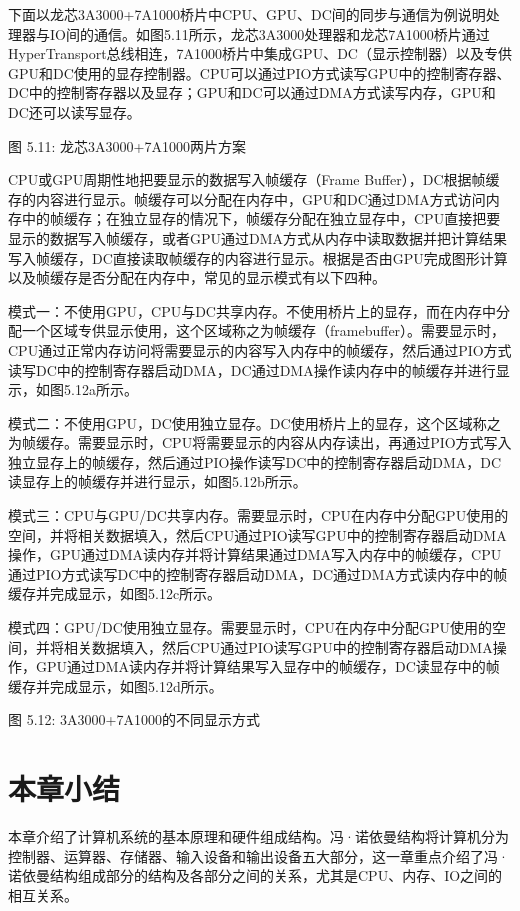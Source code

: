 \documentclass[]{ctexbook}
\begin{document}
下面以龙芯3A3000+7A1000桥片中CPU、GPU、DC间的同步与通信为例说明处理器与IO间的通信。如图5.11所示，龙芯3A3000处理器和龙芯7A1000桥片通过HyperTransport总线相连，7A1000桥片中集成GPU、DC（显示控制器）以及专供GPU和DC使用的显存控制器。CPU可以通过PIO方式读写GPU中的控制寄存器、DC中的控制寄存器以及显存；GPU和DC可以通过DMA方式读写内存，GPU和DC还可以读写显存。

图 5.11: 龙芯3A3000+7A1000两片方案

CPU或GPU周期性地把要显示的数据写入帧缓存（Frame Buffer），DC根据帧缓存的内容进行显示。帧缓存可以分配在内存中，GPU和DC通过DMA方式访问内存中的帧缓存；在独立显存的情况下，帧缓存分配在独立显存中，CPU直接把要显示的数据写入帧缓存，或者GPU通过DMA方式从内存中读取数据并把计算结果写入帧缓存，DC直接读取帧缓存的内容进行显示。根据是否由GPU完成图形计算以及帧缓存是否分配在内存中，常见的显示模式有以下四种。

模式一：不使用GPU，CPU与DC共享内存。不使用桥片上的显存，而在内存中分配一个区域专供显示使用，这个区域称之为帧缓存（framebuffer）。需要显示时，CPU通过正常内存访问将需要显示的内容写入内存中的帧缓存，然后通过PIO方式读写DC中的控制寄存器启动DMA，DC通过DMA操作读内存中的帧缓存并进行显示，如图5.12a所示。

模式二：不使用GPU，DC使用独立显存。DC使用桥片上的显存，这个区域称之为帧缓存。需要显示时，CPU将需要显示的内容从内存读出，再通过PIO方式写入独立显存上的帧缓存，然后通过PIO操作读写DC中的控制寄存器启动DMA，DC读显存上的帧缓存并进行显示，如图5.12b所示。

模式三：CPU与GPU/DC共享内存。需要显示时，CPU在内存中分配GPU使用的空间，并将相关数据填入，然后CPU通过PIO读写GPU中的控制寄存器启动DMA操作，GPU通过DMA读内存并将计算结果通过DMA写入内存中的帧缓存，CPU通过PIO方式读写DC中的控制寄存器启动DMA，DC通过DMA方式读内存中的帧缓存并完成显示，如图5.12c所示。

模式四：GPU/DC使用独立显存。需要显示时，CPU在内存中分配GPU使用的空间，并将相关数据填入，然后CPU通过PIO读写GPU中的控制寄存器启动DMA操作，GPU通过DMA读内存并将计算结果写入显存中的帧缓存，DC读显存中的帧缓存并完成显示，如图5.12d所示。

图 5.12: 3A3000+7A1000的不同显示方式

\hypertarget{ux672cux7ae0ux5c0fux7ed3-4}{%
\section{本章小结}\label{ux672cux7ae0ux5c0fux7ed3-4}}

本章介绍了计算机系统的基本原理和硬件组成结构。冯·诺依曼结构将计算机分为控制器、运算器、存储器、输入设备和输出设备五大部分，这一章重点介绍了冯·诺依曼结构组成部分的结构及各部分之间的关系，尤其是CPU、内存、IO之间的相互关系。
\end{document}
